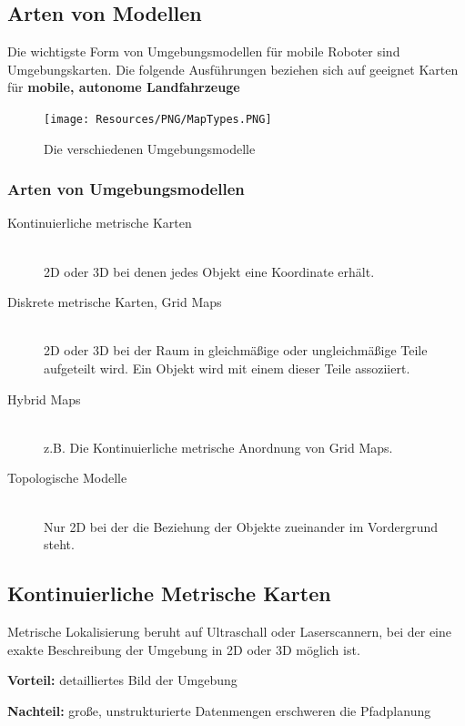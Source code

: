 \subsection{Arten von Modellen}
Die wichtigste Form von Umgebungsmodellen für mobile Roboter sind
Umgebungskarten. Die folgende Ausführungen beziehen sich auf geeignet Karten
für \textbf{mobile, autonome Landfahrzeuge}

\begin{figure}[H]
	\begin{center}
		\texttt{[image: Resources/PNG/MapTypes.PNG]}
		\caption{Die verschiedenen Umgebungsmodelle}
		\label{fig:PNG/MapTypes.PNG}
	\end{center}
\end{figure}

\subsubsection{Arten von Umgebungsmodellen}
\begin{description}
	\item[Kontinuierliche metrische Karten] \hfill \\
	 	2D oder 3D bei denen jedes Objekt eine Koordinate erhält.
	\item[Diskrete  metrische Karten, Grid Maps] \hfill \\
		2D oder 3D bei der Raum in gleichmäßige oder ungleichmäßige Teile
		aufgeteilt wird. Ein Objekt wird mit einem dieser Teile assoziiert.
	\item[Hybrid Maps] \hfill \\
		z.B. Die Kontinuierliche metrische Anordnung von Grid Maps.
	\item[Topologische Modelle] \hfill \\
		Nur 2D bei der die Beziehung der Objekte zueinander im Vordergrund steht.
\end{description}

\subsection{Kontinuierliche Metrische Karten}
Metrische Lokalisierung beruht auf Ultraschall oder Laserscannern, bei der
eine exakte Beschreibung der Umgebung in 2D oder 3D möglich ist.

\textbf{Vorteil:} detailliertes Bild der Umgebung

\textbf{Nachteil:} große, unstrukturierte Datenmengen erschweren die
Pfadplanung

